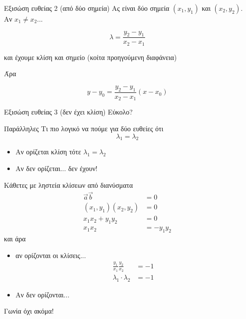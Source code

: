 \documentclass{../../presentation}
\begin{document}
\begin{frame}{Εξισώση ευθείας 2 (από δύο σημεία)}
  Ας είναι δύο σημεία $(x_1,y_1)$ και $(x_2,y_2)$. Αν $x_1\ne x_2$... \pause

  $$λ=\frac{y_2-y_1}{x_2-x_1}$$ \pause

  και έχουμε κλίση και σημείο (κοίτα προηγούμενη διαφάνεια) \pause

  Άρα

  $$y-y_0=\frac{y_2-y_1}{x_2-x_1}(x-x_0)$$
\end{frame}

\begin{frame}{Εξισώση ευθείας 3 (δεν έχει κλίση)}
  Εύκολο?
\end{frame}

\begin{frame}{Παράλληλες}
  Τι πιο λογικό να πούμε για δύο ευθείες ότι
  $$λ_1=λ_2$$
  \begin{itemize}[<+(2)->]
    \item Αν ορίζεται κλίση τότε $λ_1=λ_2$
    \item Αν δεν ορίζεται... δεν έχουν!
  \end{itemize}
\end{frame}

\begin{frame}{Κάθετες}
  με ληστεία κλίσεων από διανύσματα
  \begin{align*}
    \vec{a}\vec{b}     & =0       \\
    (x_1,y_1)(x_2,y_2) & =0       \\
    x_1x_2+y_1y_2      & =0       \\
    x_1x_2             & =-y_1y_2
  \end{align*}
  και άρα
  \begin{itemize}[<+(1)->]
    \item αν ορίζονται οι κλίσεις...
          \begin{align*}
            \frac{y_1}{x_1}\frac{y_2}{x_2} & =-1 \\
            λ_1\cdot λ_2                   & =-1
          \end{align*}
    \item Αν δεν ορίζονται...
  \end{itemize}

\end{frame}

\begin{frame}{Γωνία}
  όχι ακόμα!
\end{frame}
\end{document}
